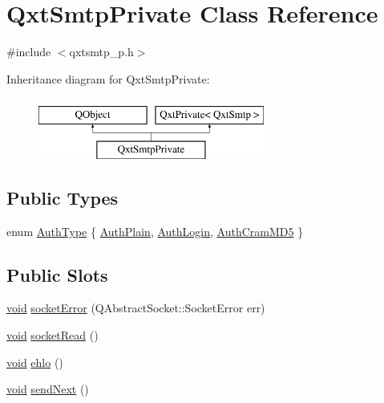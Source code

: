\hypertarget{class_qxt_smtp_private}{\section{Qxt\-Smtp\-Private Class Reference}
\label{class_qxt_smtp_private}
}


{\ttfamily \#include $<$qxtsmtp\-\_\-p.\-h$>$}

Inheritance diagram for Qxt\-Smtp\-Private\-:\begin{figure}[H]
\begin{center}
\leavevmode
\includegraphics[height=2.000000cm]{class_qxt_smtp_private}
\end{center}
\end{figure}
\subsection*{Public Types}
\begin{DoxyCompactItemize}
\item 
enum \hyperlink{class_qxt_smtp_private_a61d8923026f0f75d0132d1bd42f4f4bc}{Auth\-Type} \{ \hyperlink{class_qxt_smtp_private_a61d8923026f0f75d0132d1bd42f4f4bca6943de1b8087ba0b84c2c0eb79e680e7}{Auth\-Plain}, 
\hyperlink{class_qxt_smtp_private_a61d8923026f0f75d0132d1bd42f4f4bca7a1e7627de0864b663593513b68ce469}{Auth\-Login}, 
\hyperlink{class_qxt_smtp_private_a61d8923026f0f75d0132d1bd42f4f4bcaac6070a05b6dfd41f37d2f29bbd38853}{Auth\-Cram\-M\-D5}
 \}
\end{DoxyCompactItemize}
\subsection*{Public Slots}
\begin{DoxyCompactItemize}
\item 
\hyperlink{group___u_a_v_objects_plugin_ga444cf2ff3f0ecbe028adce838d373f5c}{void} \hyperlink{class_qxt_smtp_private_ac91e4181f516273a122e85452a9d3a5b}{socket\-Error} (Q\-Abstract\-Socket\-::\-Socket\-Error err)
\item 
\hyperlink{group___u_a_v_objects_plugin_ga444cf2ff3f0ecbe028adce838d373f5c}{void} \hyperlink{class_qxt_smtp_private_a97e60e4218d6314ed68497bcabbe33b5}{socket\-Read} ()
\item 
\hyperlink{group___u_a_v_objects_plugin_ga444cf2ff3f0ecbe028adce838d373f5c}{void} \hyperlink{class_qxt_smtp_private_ad563fdef397f3afc2677325b78c6b86f}{ehlo} ()
\item 
\hyperlink{group___u_a_v_objects_plugin_ga444cf2ff3f0ecbe028adce838d373f5c}{void} \hyperlink{class_qxt_smtp_private_a40828cda6e492f12ed56dcebaa06897a}{send\-Next} ()
\end{DoxyCompactItemize}
